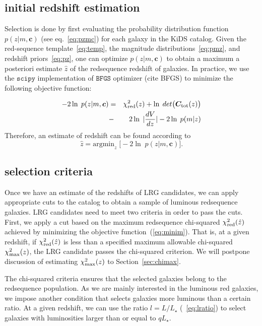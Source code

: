 \documentclass[fleqn,usenatbib]{mnras}
\newcommand{\be}{\begin{equation}}
\newcommand{\ee}{\end{equation}}
\newcommand{\vc}{\bm{c}}
\newcommand{\vCt}{\bm{C}_{\rm tot}(z)}
\begin{document}
\subsection{initial redshift estimation}

Selection is done by first evaluating the probability distribution function 
$p(z|m,\vc)$ (see eq.~\ref{eq:pzmc}) for each galaxy in the KiDS catalog. Given the red-sequence template~\ref{eq:temp}, the magnitude distributions~\ref{eq:pmz}, and redshift priors~\ref{eq:pz},
one can optimize $p(z|m,\vc)$ to obtain a maximum a posteriori estimate $\hat{z}$ of the redsequence redshift of galaxies. In practice, we use the $\mathtt{scipy}$ implementation of $\mathtt{BFGS}$ optimizer (cite BFGS) to minimize the following objective function:

\begin{eqnarray} 
-2\ln \; p(z|m,\vc) &=& \chi^{2}_{\rm red}(z) + \ln\; det\big(\vCt\big) \nonumber \\  
                    &-& 2 \ln \; |\frac{dV}{dz}|-2\ln\;p(m|z) 
\end{eqnarray} 
Therefore, an estimate of redshift can be found according to
\be 
\hat{z} = \mathrm{argmin}_{z} \; \big[-2\ln \; p(z|m,\vc)\big].
\label{eq:minim}
\ee

\subsection{selection criteria}
Once we have an estimate of the redshifts of LRG candidates, we can apply appropriate 
cuts to the catalog to obtain a sample of luminous redsequence galaxies. LRG candidates need 
to meet two criteria in order to pass the cuts. First, we apply a cut based on the maximum redsequence chi-squared $\chi^{2}_{\rm red}({\hat{z}})$ achieved by minimizing the objective function~(\ref{eq:minim}). That is, at a given redshift, if $\chi^{2}_{\rm red}({\hat{z}})$ is less than a specified maximum allowable chi-squared $\chi^{2}_{\rm max}(z)$, the LRG candidate passes the chi-squared  criterion. We will postpone discussion of estimating $\chi^{2}_{\rm max}(z)$ to Section~\ref{sec:chimax}.

The chi-squared criteria ensures that the selected galaxies belong to the redsequence population. As we are mainly interested in the luminous red galaxies, we impose another condition that selects galaxies more luminous than a certain ratio. At a given redshift, we can use the ratio $l = L/L_{\star}$ (~\ref{eq:lratio}) to select galaxies with luminosities larger than or equal to $qL_{\star}$. 
\end{document}
